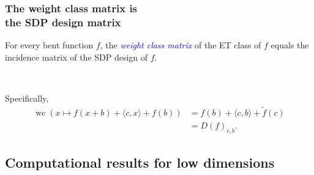 \documentclass[pdf,sprung,slideColor,nocolorBG]{beamer}
\newenvironment{colortheme}[1]{
\def\ProvidesPackageRCS $##1${\relax}
\renewcommand{\ProcessOptions}{\relax}
\makeatletter

\makeatother
}{}
\newcommand{\Emph}[1]{\emph{\textcolor{blue}{#1}}}
\newcommand{\dual}[1]{\widetilde{#1}}
\newcommand{\weightclass}[1]{\operatorname{wc}\left(#1\right)}
\begin{document}
\begin{colortheme}{jubata}

\begin{frame}
\frametitle{The weight class matrix is \\ the SDP design matrix}
\begin{Theorem}
For every bent function $f$, the \Emph{weight class matrix} of the ET class of $f$
equals the incidence matrix of the SDP design of $f$.

~

Specifically,
\begin{align*}
\weightclass{x \mapsto f(x+b) + \langle c, x \rangle + f(b)}
&=
f(b) + \langle c, b \rangle + \dual{f}(c)
\\
&=
D(f)_{c,b}.
\end{align*}

\end{Theorem}

\end{frame}

\end{colortheme}

\subsection{Computational results for low dimensions}
\end{document}
